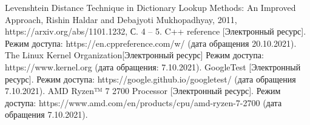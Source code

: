 %

\begin{thebibliography}{5}
Levenshtein Distance Technique in Dictionary Lookup Methods: An Improved Approach, Rishin Haldar and Debajyoti Mukhopadhyay, 2011, https://arxiv.org/abs/1101.1232, С. 4 -- 5.
C++ reference [Электронный ресурс]. Режим доступа: https://en.cppreference.com/w/ (дата обращения 20.10.2021).
The Linux Kernel Organization[Электронный ресурс] Режим доступа: https://www.kernel.org (дата обращения: 7.10.2021).
GoogleTest [Электронный ресурс]. Режим доступа: https://google.github.io/googletest/ (дата обращения 7.10.2021).
AMD Ryzen™ 7 2700 Processor [Электронный ресурс]. Режим доступа: https://www.amd.com/en/products/cpu/amd-ryzen-7-2700 (дата обращения 7.10.2021).
\end{thebibliography}
